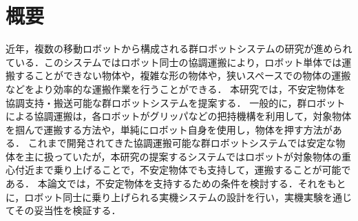 \section*{\LARGE 概要}
近年，複数の移動ロボットから構成される群ロボットシステムの研究が進められている．このシステムではロボット同士の協調運搬により，ロボット単体では運搬することができない物体や，複雑な形の物体や，狭いスペースでの物体の運搬などをより効率的な運搬作業を行うことができる．
本研究では，不安定物体を協調支持・搬送可能な群ロボットシステムを提案する．
一般的に，群ロボットによる協調運搬は，各ロボットがグリッパなどの把持機構を利用して，対象物体を掴んで運搬する方法や，単純にロボット自身を使用し，物体を押す方法がある．
これまで開発されてきた協調運搬可能な群ロボットシステムでは安定な物体を主に扱っていたが，本研究の提案するシステムではロボットが対象物体の重心付近まで乗り上げることで，不安定物体でも支持して，運搬することが可能である．
本論文では，不安定物体を支持するための条件を検討する．それをもとに，ロボット同士に乗り上げられる実機システムの設計を行い，実機実験を通じてその妥当性を検証する．
